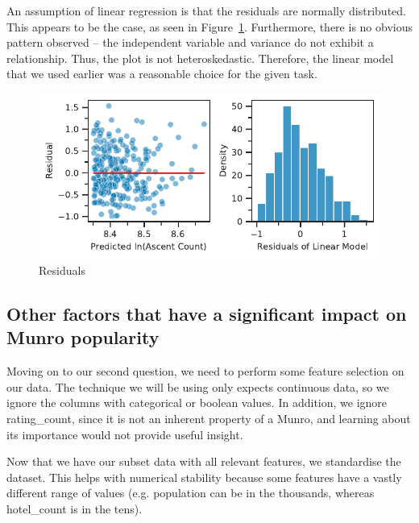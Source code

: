 \documentclass[11pt,a4paper]{article}
\begin{document}
An assumption of linear regression is that the residuals are normally distributed. This appears to be the case, as seen in Figure~\ref{fds-project-template:fig:uni_residuals}. Furthermore, there is no obvious pattern observed – the independent variable and variance do not exhibit a relationship. 
Thus, the plot is not heteroskedastic. Therefore, the linear model that we used earlier was a reasonable choice for the given task.
\begin{figure} [h!]
  \centering
  \includegraphics{report/uni_residuals.pdf}
  \caption{Residuals}
  \label{fds-project-template:fig:uni_residuals}
\end{figure}
\subsection{Other factors that have a significant impact on Munro popularity}

Moving on to our second question, we need to perform some feature selection on our data. The technique we will be using only expects continuous data, so we ignore the columns with categorical or boolean values. In addition, we ignore rating\_count, since it is not an inherent property of a Munro, and learning about its importance would not provide useful insight.

Now that we have our subset data with all relevant features, we standardise the dataset. This helps with numerical stability because some features have a vastly different range of values (e.g. population can be in the thousands, whereas hotel\_count is in the tens).
\end{document}
